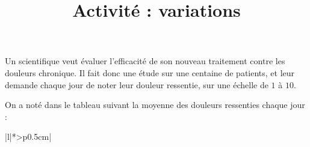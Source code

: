 \documentclass[
	classe=$2^{de}$,
]{exercice}
\title{Activité : variations}
\begin{document}
\maketitle

\begin{tcolorbox}
	Un scientifique veut évaluer l'efficacité de son nouveau traitement contre les douleurs chronique. Il fait donc une étude sur une centaine de patients, et leur demande chaque jour de noter leur douleur ressentie, sur une échelle de $1$ à $10$.

	On a noté dans le tableau suivant la moyenne des douleurs ressenties chaque jour :

	\begin{center}
		\begin{tabular}{|l|*{}{>{\centering}p{0.5cm}|}}
			\hline
			 \tabularnewline\hline
			  \tabularnewline\hline
		\end{tabular}
	\end{center}
\end{tcolorbox}
\end{document}
